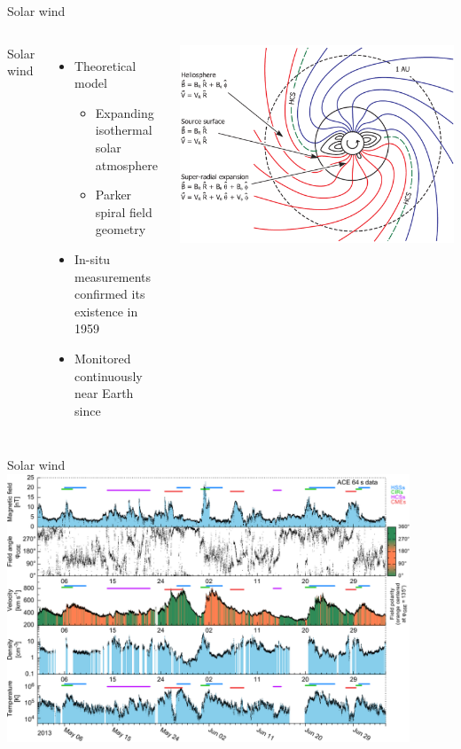 \begin{frame}[plain,c]{Solar wind}{}
	\begin{columns}[c]
		
		Solar wind
		\begin{itemize}
			\item Theoretical model \citep{Parker1958}
			\begin{itemize}
				\item Expanding isothermal solar atmosphere
				\item Parker spiral field geometry
			\end{itemize}
			\item<3-> In-situ measurements confirmed its existence in 1959
			\item<3-> Monitored continuously near Earth since
		\end{itemize}
		
		
		\includegraphics[width=\textwidth]{../figures_of_others/images/Owens2013_PFSS_Sectors_screenshot.png}
		
	\end{columns}
\end{frame}
\begin{frame}[plain,c]{Solar wind}{}
	\centering
	\includegraphics[width=0.9\textwidth]{../figures_of_mine/gnuplots/ACE_64s_v7_thesis_CIRs_2013-5-1_65_plot.pdf}
	
\end{frame}
